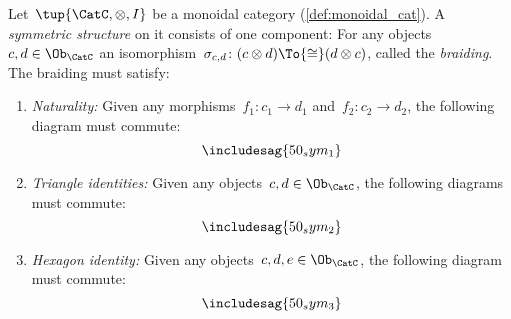 \begin{ctdefinition}
Let~$\tup{\CatC,\otimes,I}$ be a monoidal category (\cref{def:monoidal_cat}). A \emph{symmetric structure} on it consists of one component: For any objects~$c,d\in\Ob_\CatC$ an isomorphism~$\sigma_{c,d}\colon (c\otimes d)\To{\cong}(d\otimes c)$, called the \emph{braiding}. The braiding must satisfy:
\begin{enumerate}
	\item \emph{Naturality:} Given any morphisms~$f_1\colon c_1\to d_1$ and~$f_2\colon c_2\to d_2$, the following diagram must commute:
	\begin{equation}
	\includesag{50_sym_1}
	\end{equation}
	\item \emph{Triangle identities:} Given any objects~$c,d\in\Ob_\CatC$, the following diagrams must commute:
\begin{equation}
	\includesag{50_sym_2}
\end{equation}
\item \emph{Hexagon identity:} Given any objects~$c,d,e\in \Ob_\CatC$, the following diagram must commute:
\begin{equation}
    \includesag{50_sym_3}
\end{equation}
\end{enumerate}
\end{ctdefinition}
